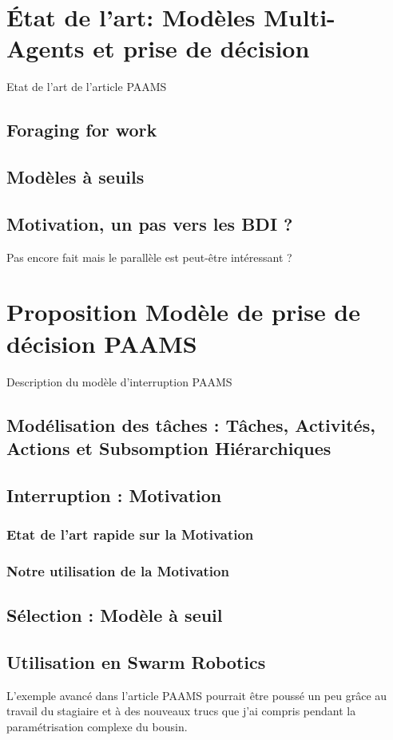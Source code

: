 \documentclass[10pt,a4paper]{article}
\begin{document}
\section{État de l'art: Modèles Multi-Agents et prise de décision}
	Etat de l'art de l'article PAAMS
	\subsection{Foraging for work}
	\subsection{Modèles à seuils}
	\subsection{Motivation, un pas vers les BDI ?}
		Pas encore fait mais le parallèle est peut-être intéressant ?
\section{Proposition Modèle de prise de décision PAAMS}
	Description du modèle d'interruption PAAMS
	\subsection{Modélisation des tâches : Tâches, Activités, Actions et Subsomption Hiérarchiques}
	\subsection{Interruption : Motivation}
		\subsubsection{Etat de l'art rapide sur la Motivation}
		\subsubsection{Notre utilisation de la Motivation}
	\subsection{Sélection : Modèle à seuil}
	\subsection{Utilisation en Swarm Robotics}
		L'exemple avancé dans l'article PAAMS pourrait être poussé un peu grâce au travail du stagiaire et à des nouveaux trucs que j'ai compris pendant la paramétrisation complexe du bousin.
			
\end{document}
